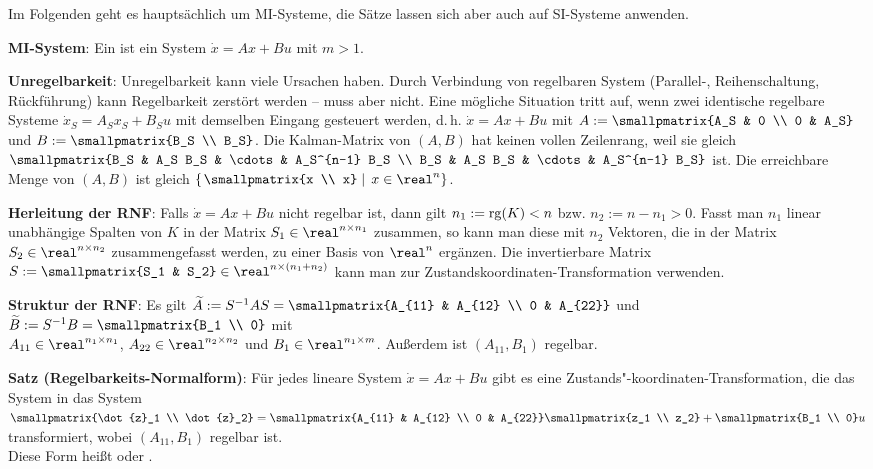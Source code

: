 Im Folgenden geht es hauptsächlich um MI-Systeme, die Sätze lassen sich aber auch auf SI-Systeme
anwenden.

\textbf{MI-System}:
Ein  ist ein System $\dot{x} = Ax + Bu$ mit $m > 1$.

\linie

\textbf{Unregelbarkeit}:
Unregelbarkeit kann viele Ursachen haben.
Durch Verbindung von regelbaren System (Parallel-, Reihenschaltung, Rückführung)
kann Regelbarkeit zerstört werden -- muss aber nicht.
Eine mögliche Situation tritt auf,
wenn zwei identische regelbare Systeme $\dot{x}_S = A_S x_S + B_S u$ mit demselben
Eingang gesteuert werden,
d.\,h. $\dot{x} = Ax + Bu$ mit $A := \smallpmatrix{A_S & 0 \\ 0 & A_S}$ und
$B := \smallpmatrix{B_S \\ B_S}$.
Die Kalman-Matrix von $(A, B)$ hat keinen vollen Zeilenrang, weil sie gleich
$\smallpmatrix{B_S & A_S B_S & \cdots & A_S^{n-1} B_S \\ B_S & A_S B_S & \cdots & A_S^{n-1} B_S}$
ist.
Die erreichbare Menge von $(A, B)$ ist gleich
$\left\{\left.\smallpmatrix{x \\ x} \;\right|\; x \in \real^n\right\}$.

\linie

\textbf{Herleitung der RNF}:
Falls $\dot{x} = Ax + Bu$ nicht regelbar ist, dann gilt $n_1 := \operatorname{rg}(K) < n$
bzw. $n_2 := n - n_1 > 0$.
Fasst man $n_1$ linear unabhängige Spalten von $K$ in der Matrix $S_1 \in \real^{n \times n_1}$
zusammen, so kann man diese mit $n_2$ Vektoren, die in der Matrix $S_2 \in \real^{n \times n_2}$
zusammengefasst werden, zu einer Basis von $\real^n$ ergänzen.
Die invertierbare Matrix $S := \smallpmatrix{S_1 & S_2} \in \real^{n \times (n_1 + n_2)}$
kann man zur Zustandskoordinaten-Transformation verwenden.

\textbf{Struktur der RNF}:
Es gilt $\widetilde{A} := S^{-1} AS = \smallpmatrix{A_{11} & A_{12} \\ 0 & A_{22}}$
und $\widetilde{B} := S^{-1} B = \smallpmatrix{B_1 \\ 0}$ mit\\
$A_{11} \in \real^{n_1 \times n_1}$, $A_{22} \in \real^{n_2 \times n_2}$ und
$B_1 \in \real^{n_1 \times m}$.
Außerdem ist $(A_{11}, B_1)$ regelbar.

\textbf{Satz (Regelbarkeits-Normalform)}:
Für jedes lineare System $\dot{x} = Ax + Bu$ gibt es eine Zustands"-koordinaten-Transformation,
die das System in das System\\
$\smallpmatrix{\dot{z}_1 \\ \dot{z}_2} =
\smallpmatrix{A_{11} & A_{12} \\ 0 & A_{22}} \smallpmatrix{z_1 \\ z_2} +
\smallpmatrix{B_1 \\ 0} u$ transformiert,
wobei $(A_{11}, B_1)$ regelbar ist.\\
Diese Form heißt
 oder .

